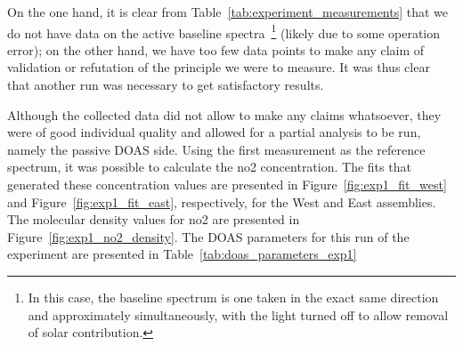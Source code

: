 \begin{table}[htpb]
    \centering
    \caption{First run: measurement table.}
    \label{tab:experiment_measurements}
\end{table}

On the one hand, it is clear from
Table~\ref{tab:experiment_measurements} that we do not have data on the
active baseline spectra~\footnote{In this case, the baseline spectrum is
one taken in the exact same direction and approximately
simultaneously, with the light turned off to allow removal of solar
contribution.} (likely due to some operation error); on the other hand,
we have too few data points to make any claim of validation or
refutation of the principle we were to measure. It was thus clear that
another run was necessary to get satisfactory results.

Although the collected data did not allow to make any claims whatsoever,
they were of good individual quality and allowed for a partial analysis
to be run, namely the passive \gls{DOAS} side. Using the first
measurement as the reference spectrum, it was possible to calculate the
\gls{no2} concentration. The fits that generated these concentration
values are presented in Figure~\ref{fig:exp1_fit_west} and
Figure~\ref{fig:exp1_fit_east}, respectively, for the West and East
assemblies. The molecular density values for \gls{no2} are presented in
Figure~\ref{fig:exp1_no2_density}. The \gls{DOAS} parameters for this
run of the experiment are presented in
Table~\ref{tab:doas_parameters_exp1}

